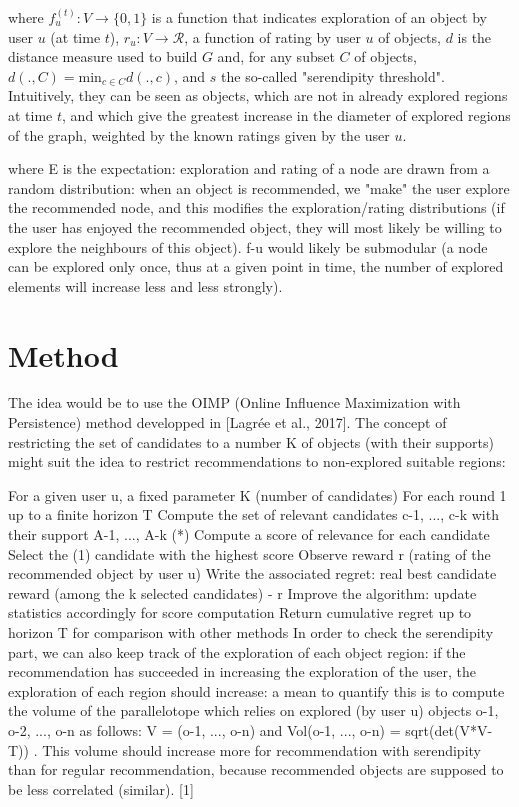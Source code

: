 \documentclass{article}
\begin{document}
where $f^{(t)}_u : V \rightarrow \{0,1\}$ is a function that indicates exploration of an object by user $u$ (at time $t$), $r_u : V \rightarrow \mathscr{R}$, a function of rating by user $u$ of objects, $d$ is the distance measure used to build $G$ and, for any subset $C$ of objects, $d(., C) = \text{min}_{c \in C} d(., c)$, and $s$ the so-called "serendipity threshold".\\

Intuitively, they can be seen as objects, which are not in already explored regions at time $t$, and which give the greatest increase in the diameter of explored regions of the graph, weighted by the known ratings given by the user $u$.



where E is the expectation: exploration and rating of a node are drawn from a random distribution: when an object is recommended, we "make" the user explore the recommended node, and this modifies the exploration/rating distributions (if the user has enjoyed the recommended object, they will most likely be willing to explore the neighbours of this object).
f-u would likely be submodular (a node can be explored only once, thus at a given point in time, the number of explored elements will increase less and less strongly).

\section{Method}

The idea would be to use the OIMP (Online Influence Maximization with Persistence) method developped in [Lagrée et al., 2017]. The concept of restricting the set of candidates to a number K of objects (with their supports) might suit the idea to restrict recommendations to non-explored suitable regions:

For a given user u, a fixed parameter K (number of candidates)
For each round 1 up to a finite horizon T
	Compute the set of relevant candidates c-1, ..., c-k with their support A-1, ..., A-k (*)
	Compute a score of relevance for each candidate
	Select the (1) candidate with the highest score
	Observe reward r (rating of the recommended object by user u)
	Write the associated regret: real best candidate reward (among the k selected candidates) - r
	Improve the algorithm: update statistics accordingly for score computation
Return cumulative regret up to horizon T for comparison with other methods
In order to check the serendipity part, we can also keep track of the exploration of each object region: if the recommendation has succeeded in increasing the exploration of the user, the exploration of each region should increase: a mean to quantify this is to compute the volume of the parallelotope which relies on explored (by user u) objects o-1, o-2, ..., o-n as follows: V = (o-1, ..., o-n) and Vol(o-1, ..., o-n) = sqrt(det(V*V-T)) . This volume should increase more for recommendation with serendipity than for regular recommendation, because recommended objects are supposed to be less correlated (similar). [1]
\end{document}
